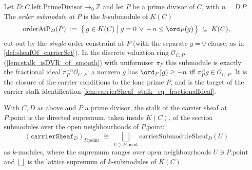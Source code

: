 \begin{definition}

  \label{def:sheafOf_orderAtPSubmodule}
  Let \(D : C.\mathrm{left.PrimeDivisor} \to_0 \mathbb Z\) and let \(P\) be a
  prime divisor of \(C\), with \(n = D\,P\). The \emph{order submodule at \(P\)}
  is the \(\bar k\)-submodule of \(K(C)\)
  \[
    \mathrm{orderAtP}_D(P) \;:=\;
    \bigl\{\, g \in K(C) \;\big|\; g = 0 \,\lor\, -\,n \le \ord_P(g) \,\bigr\}
    \;\subseteq\; K(C),
  \]
  cut out by the \emph{single} order constraint at \(P\) (with the separate
  \(g = 0\) clause, as in \cref{def:sheafOf_carrierSet}). In the discrete
  valuation ring \(\mathcal O_{C,P}\) (\cref{lem:stalk_isDVR_of_smooth}) with
  uniformiser \(\pi_P\) this submodule is exactly the fractional ideal
  \(\pi_P^{-n}\mathcal O_{C,P}\): a nonzero \(g\) has \(\ord_P(g) \ge -n\) iff
  \(\pi_P^{\,n} g \in \mathcal O_{C,P}\). It is the closure of the carrier
  conditions to the lone prime \(P\), and is the target of the carrier-stalk
  identification \cref{lem:carrierSheaf_stalk_eq_fractionalIdeal}.
\end{definition}

\begin{lemma}

  \label{lem:carrierSheaf_stalk_iso_iSup}
  With \(C, D\) as above and \(P\) a prime divisor, the stalk of the carrier
  sheaf at \(P.\mathrm{point}\) is the directed supremum, taken inside \(K(C)\),
  of the section submodules over the open neighbourhoods of \(P.\mathrm{point}\):
  \[
    (\texttt{carrierSheaf}_D)_{P.\mathrm{point}} \;\cong\;
    \bigsqcup_{U \ni P.\mathrm{point}}
        \mathrm{carrierSubmoduleSheaf}_D(U)
  \]
  as \(\bar k\)-modules, where the supremum ranges over open
  neighbourhoods \(U \ni P.\mathrm{point}\) and \(\bigsqcup\) is the lattice
  supremum of \(\bar k\)-submodules of \(K(C)\).
\end{lemma}


